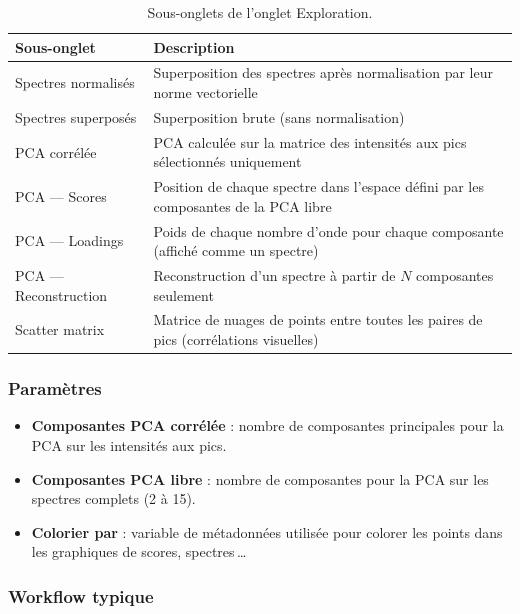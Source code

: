 \documentclass[12pt, a4paper]{article}
\begin{document}
\begin{table}[h!]
  \centering
  \caption{Sous-onglets de l'onglet Exploration.}
  \label{tab:subtabs}
  \begin{tabularx}{\textwidth}{lX}
    \toprule
    \textbf{Sous-onglet} & \textbf{Description} \\
    \midrule
    Spectres normalisés  & Superposition des spectres après normalisation
                           par leur norme vectorielle \\
    Spectres superposés  & Superposition brute (sans normalisation) \\
    PCA corrélée         & PCA calculée sur la matrice des intensités aux pics
                           sélectionnés uniquement \\
    PCA --- Scores       & Position de chaque spectre dans l'espace défini par
                           les composantes de la PCA libre \\
    PCA --- Loadings     & Poids de chaque nombre d'onde pour chaque composante
                           (affiché comme un spectre) \\
    PCA --- Reconstruction & Reconstruction d'un spectre à partir de $N$
                           composantes seulement \\
    Scatter matrix       & Matrice de nuages de points entre toutes les paires
                           de pics (corrélations visuelles) \\
    \bottomrule
  \end{tabularx}
\end{table}

\subsubsection{Paramètres}

\begin{itemize}
  \item \textbf{Composantes PCA corrélée} : nombre de composantes principales
        pour la PCA sur les intensités aux pics.
  \item \textbf{Composantes PCA libre} : nombre de composantes pour la PCA sur
        les spectres complets (2 à 15).
  \item \textbf{Colorier par} : variable de métadonnées utilisée pour colorer
        les points dans les graphiques de scores, spectres\,\ldots
\end{itemize}

\subsubsection{Workflow typique}
\end{document}
